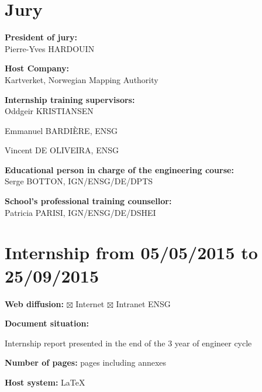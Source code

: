 \newevenpage
\thispagestyle{plain}
\section*{Jury}
\shorthandoff{:}

\vspace{0.5cm}

\textbf{President of jury:} \\

Pierre-Yves HARDOUIN

\vspace{0.5cm}

\textbf{Host Company:} \\

Kartverket, Norwegian Mapping Authority

\vspace{0.5cm}

\textbf{Internship training supervisors:} \\ 

Oddgeir KRISTIANSEN \par
Emmanuel BARDIÈRE, ENSG \par
Vincent DE OLIVEIRA, ENSG

\vspace{0.5cm}

\textbf{Educational person in charge of the engineering course:} \\

Serge BOTTON, IGN/ENSG/DE/DPTS

\vspace{0.5cm}

\textbf{School's professional training counsellor:} \\

Patricia PARISI, IGN/ENSG/DE/DSHEI

\vspace{1cm}


\section*{Internship from 05/05/2015 to 25/09/2015}
\vspace{0.3cm}
\textbf{Web diffusion:} $\boxtimes$ Internet \hspace{0.2cm} $\boxtimes$ Intranet ENSG

\vspace{0.3cm}
\textbf{Document situation:} 

\vspace{0.2cm}
\par
Internship report presented in the end of the 3 year of engineer cycle

\vspace{0.3cm}
\textbf{Number of pages:}  pages including  annexes

\vspace{0.3cm}
\textbf{Host system:} \LaTeX
\vspace{1cm}